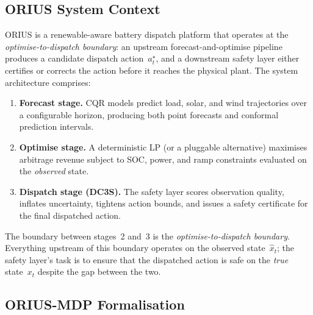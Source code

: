\subsection{ORIUS System Context}
\label{sec:orius-context}

ORIUS is a renewable-aware battery dispatch platform that operates at
the \emph{optimise-to-dispatch boundary}: an upstream forecast-and-optimise
pipeline produces a candidate dispatch action~$a_t^{\star}$, and a
downstream safety layer either certifies or corrects the action before it
reaches the physical plant.  The system architecture comprises:

\begin{enumerate}
  \item \textbf{Forecast stage.}  CQR models predict load, solar, and
    wind trajectories over a configurable horizon, producing both point
    forecasts and conformal prediction intervals.
  \item \textbf{Optimise stage.}  A deterministic LP (or a pluggable
    alternative) maximises arbitrage revenue subject to SOC, power, and
    ramp constraints evaluated on the \emph{observed} state.
  \item \textbf{Dispatch stage (DC3S).}  The safety layer scores
    observation quality, inflates uncertainty, tightens action bounds, and
    issues a safety certificate for the final dispatched action.
\end{enumerate}

The boundary between stages~2 and~3 is the \emph{optimise-to-dispatch
boundary}.  Everything upstream of this boundary operates on the observed
state~$\hat{x}_t$; the safety layer's task is to ensure that the
dispatched action is safe on the \emph{true} state~$x_t$ despite the gap
between the two.

\subsection{ORIUS-MDP Formalisation}


